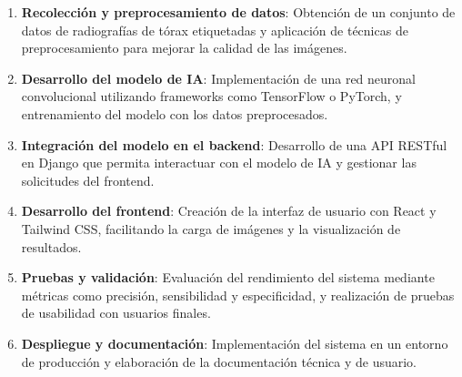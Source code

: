\documentclass[conference]{IEEEtran}
\begin{document}
\begin{enumerate}
    \item \textbf{Recolección y preprocesamiento de datos}: Obtención de un conjunto de datos de radiografías de tórax etiquetadas y aplicación de técnicas de preprocesamiento para mejorar la calidad de las imágenes.
    \item \textbf{Desarrollo del modelo de IA}: Implementación de una red neuronal convolucional utilizando frameworks como TensorFlow o PyTorch, y entrenamiento del modelo con los datos preprocesados.
    \item \textbf{Integración del modelo en el backend}: Desarrollo de una API RESTful en Django que permita interactuar con el modelo de IA y gestionar las solicitudes del frontend.
    \item \textbf{Desarrollo del frontend}: Creación de la interfaz de usuario con React y Tailwind CSS, facilitando la carga de imágenes y la visualización de resultados.
    \item \textbf{Pruebas y validación}: Evaluación del rendimiento del sistema mediante métricas como precisión, sensibilidad y especificidad, y realización de pruebas de usabilidad con usuarios finales.
    \item \textbf{Despliegue y documentación}: Implementación del sistema en un entorno de producción y elaboración de la documentación técnica y de usuario.
\end{enumerate}
\end{document}
